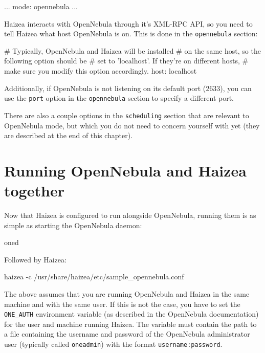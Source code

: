 \begin{wideshellverbatim}
[general]
...
mode: opennebula
...
\end{wideshellverbatim}

Haizea interacts with OpenNebula through it's XML-RPC API, so you need to tell Haizea what host OpenNebula is on. This is done in the \texttt{opennebula} section:

\begin{wideshellverbatim}
[opennebula]
# Typically, OpenNebula and Haizea will be installed
# on the same host, so the following option should be
# set to 'localhost'. If they're on different hosts,
# make sure you modify this option accordingly.
host: localhost
\end{wideshellverbatim}

Additionally, if OpenNebula is not listening on its default port (2633), you can use the \texttt{port} option in the \texttt{opennebula} section to specify a different port.

There are also a couple options in the \texttt{scheduling} section that are relevant to OpenNebula mode, but which you do not need to concern yourself with yet (they are described at the end of this chapter).

\section{Running OpenNebula and Haizea together}

Now that Haizea is configured to run alongside OpenNebula, running them is as simple as starting the OpenNebula daemon:

\begin{wideshellverbatim}
oned
\end{wideshellverbatim}

Followed by Haizea:

\begin{wideshellverbatim}
haizea -c /usr/share/haizea/etc/sample_opennebula.conf
\end{wideshellverbatim}

The above assumes that you are running OpenNebula and Haizea in the same machine and with the same user. If this is not the case, you have to set the \texttt{ONE\_AUTH} environment variable (as described in the OpenNebula documentation) for the user and machine running Haizea. The variable must contain the path to a file containing the username and password of the OpenNebula administrator user (typically called \texttt{oneadmin}) with the format \texttt{username:password}. 

